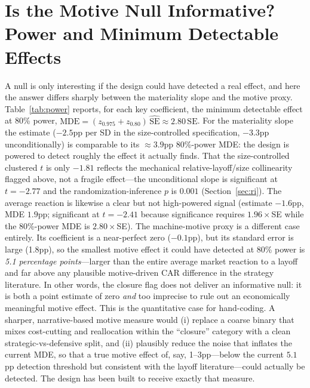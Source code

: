 \documentclass[12pt]{article}
\begin{document}
\section{Is the Motive Null Informative? Power and Minimum Detectable Effects}\label{sec:power}
A null is only interesting if the design could have detected a real effect, and
here the answer differs sharply between the materiality slope and the motive proxy.
Table~\ref{tab:power} reports, for each key coefficient, the minimum detectable
effect at 80\% power, $\text{MDE}=(z_{0.975}+z_{0.80})\,\widehat{\text{SE}}\approx
2.80\,\widehat{\text{SE}}$. For the materiality slope the estimate ($-2.5$pp per SD
in the size-controlled specification, $-3.3$pp unconditionally) is comparable to
its $\approx3.9$pp 80\%-power MDE: the design is powered to detect roughly the
effect it actually finds. That the size-controlled clustered $t$ is only $-1.81$
reflects the mechanical relative-layoff/size collinearity flagged above, not a
fragile effect---the unconditional slope is significant at $t=-2.77$ and the
randomization-inference $p$ is $0.001$ (Section~\ref{sec:ri}). The average reaction
is likewise a clear but not high-powered signal (estimate $-1.6$pp, MDE $1.9$pp;
significant at $t=-2.41$ because significance requires $1.96\times$SE while the
80\%-power MDE is $2.80\times$SE). The machine-motive proxy is a different case
entirely. Its coefficient is a near-perfect zero ($-0.1$pp), but its standard error is
large (1.8pp), so the smallest motive effect it could have detected at 80\% power
is \emph{5.1 percentage points}---larger than the entire average market reaction to
a layoff and far above any plausible motive-driven CAR difference in the strategy
literature. In other words, the closure flag does not deliver an informative null:
it is both a point estimate of zero \emph{and} too imprecise to rule out an
economically meaningful motive effect. This is the quantitative case for
hand-coding. A sharper, narrative-based motive measure would (i) replace a coarse
binary that mixes cost-cutting and reallocation within the ``closure'' category
with a clean strategic-vs-defensive split, and (ii) plausibly reduce the noise that
inflates the current MDE, so that a true motive effect of, say, 1--3pp---below the
current $5.1$pp detection threshold but consistent with the layoff literature---could
actually be detected. The design has been built to receive exactly that measure.
\end{document}
